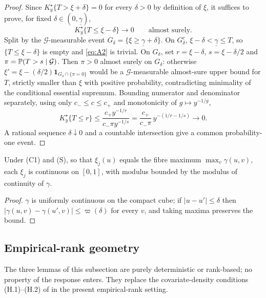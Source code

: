 \begin{proof}
Since $K_y^\star\{T>\xi+\delta\}=0$ for every $\delta>0$ by definition of
$\xi$, it suffices to prove, for fixed
$\delta\in(0,\underline\gamma)$,
\begin{equation}
 K_y^\star\{T\le\xi-\delta\}\longrightarrow0\qquad\text{almost surely.}
 \label{eq:A2}
\end{equation}
Split by the $\mathcal G$-measurable event
$G_\delta=\{\xi\ge\underline\gamma+\delta\}$.  On $G_\delta^c$,
$\xi-\delta<\underline\gamma\le T$, so $\{T\le\xi-\delta\}$ is empty and
\eqref{eq:A2} is trivial.  On $G_\delta$, set $r=\xi-\delta$,
$s=\xi-\delta/2$ and $\pi=\mathbb P(T>s\mid\mathcal G)$.  Then $\pi>0$ almost
surely on $G_\delta$: otherwise
$\xi'=\xi-(\delta/2)\mathbf 1_{G_\delta\cap\{\pi=0\}}$ would be a
$\mathcal G$-measurable almost-sure upper bound for $T$, strictly smaller
than $\xi$ with positive probability, contradicting minimality of the
conditional essential supremum.  Bounding numerator and denominator
separately, using only $c_-\le c\le c_+$ and monotonicity of
$g\mapsto y^{-1/g}$,
\[
 K_y^\star\{T\le r\}
 \le\frac{c_+y^{-1/r}}{c_-\pi y^{-1/s}}
 =\frac{c_+}{c_-\pi}\,y^{-(1/r-1/s)}\longrightarrow0.
\]
A rational sequence $\delta\downarrow0$ and a countable intersection give
a common probability-one event.
\end{proof}

\begin{lemma}\label{lem:app-envelope-cont}
Under (C1) and (S), so that $\xi_j(u)$ equals the fibre maximum
$\max_v\gamma(u,v)$, each $\xi_j$ is continuous on $[0,1]$, with
modulus bounded by the modulus of continuity of $\gamma$.
\end{lemma}

\begin{proof}
$\gamma$ is uniformly continuous on the compact cube; if
$|u-u'|\le\delta$ then $|\gamma(u,v)-\gamma(u',v)|\le\varpi(\delta)$ for
every $v$, and taking maxima preserves the bound.
\end{proof}

\subsection{Empirical-rank geometry}\label{app:rankgeom}

The three lemmas of this subsection are purely deterministic or
rank-based; no property of the response enters.  They replace the
covariate-density conditions (H.1)--(H.2) of
\citet{gardesPodgorny2025} in the present empirical-rank setting.

